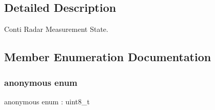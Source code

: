 \subsection{Detailed Description}
Conti Radar Measurement State. 

\subsection{Member Enumeration Documentation}
\mbox{\label{structmaf__perception__interface_1_1ContiRadarMeasurementState_a14e6b80b1f336a29bf52018183e09f21}} 
\subsubsection{\texorpdfstring{anonymous enum}{anonymous enum}}
{\footnotesize\ttfamily anonymous enum \+: uint8\+\_\+t}

